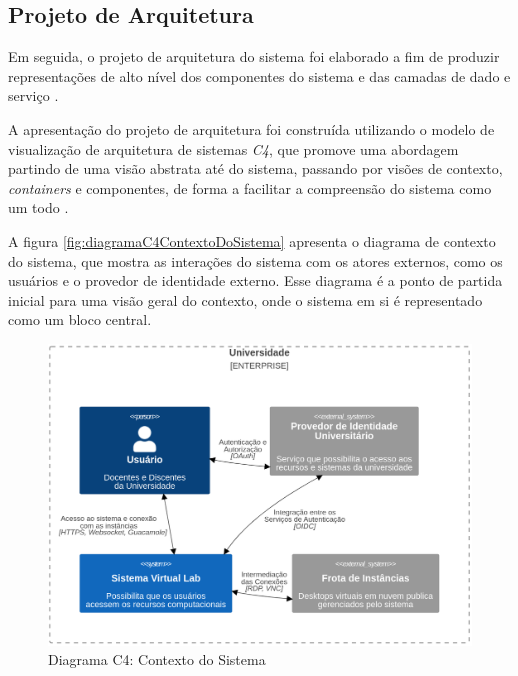 \subsection{Projeto de Arquitetura}
\label{subsec:projetoDeArquitetura}

Em seguida, o projeto de arquitetura do sistema foi elaborado a fim de produzir representações de alto nível dos componentes do sistema e das camadas de dado e serviço \citep{pressman2016}.

A apresentação do projeto de arquitetura foi construída utilizando o modelo de visualização de arquitetura de sistemas \textit{C4}, que promove uma abordagem partindo de uma visão abstrata até do sistema, passando por visões de contexto, \textit{containers} e componentes, de forma a facilitar a compreensão do sistema como um todo \citep{brown2018}.

A figura \autoref{fig:diagramaC4ContextoDoSistema} apresenta o diagrama de contexto do sistema, que mostra as interações do sistema com os atores externos, como os usuários e o provedor de identidade externo. Esse diagrama é a ponto de partida inicial para uma visão geral do contexto, onde o sistema em si é representado como um bloco central.

\begin{figure}[H]
\caption{Diagrama C4: Contexto do Sistema}
\label{fig:diagramaC4ContextoDoSistema}
\includegraphics[width=\textwidth]{capitulos/2-metodologia/files/c4-system-context.png}
\end{figure}

